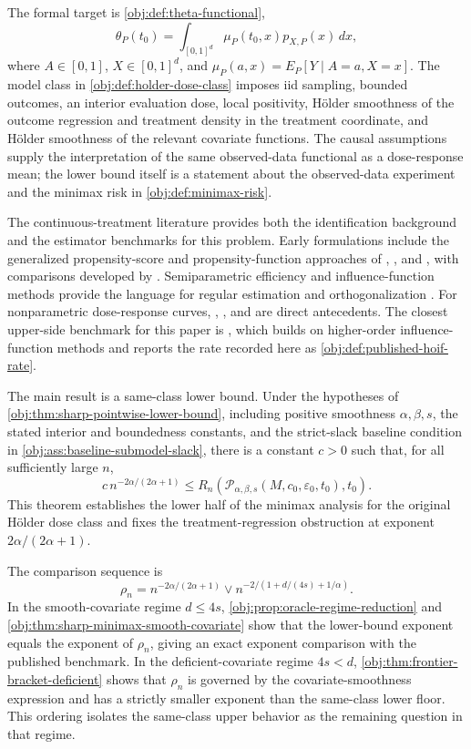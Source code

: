 The formal target is \cref{obj:def:theta-functional},
\[
\theta_P(t_0)=\int_{[0,1]^d}\mu_P(t_0,x)p_{X,P}(x)\,dx,
\]
where \(A\in[0,1]\), \(X\in[0,1]^d\), and \(\mu_P(a,x)=E_P[Y\mid A=a,X=x]\). The model class in \cref{obj:def:holder-dose-class} imposes iid sampling, bounded outcomes, an interior evaluation dose, local positivity, Hölder smoothness of the outcome regression and treatment density in the treatment coordinate, and Hölder smoothness of the relevant covariate functions. The causal assumptions supply the interpretation of the same observed-data functional as a dose-response mean; the lower bound itself is a statement about the observed-data experiment and the minimax risk in \cref{obj:def:minimax-risk}.

The continuous-treatment literature provides both the identification background and the estimator benchmarks for this problem. Early formulations include the generalized propensity-score and propensity-function approaches of \citet{imbens2000}, \citet{hirano2004}, and \citet{imai2004}, with comparisons developed by \citet{zhao2013}. Semiparametric efficiency and influence-function methods provide the language for regular estimation and orthogonalization \citep{bickel1993,vanderVaart1998,vanderLaan2003,chernozhukov2018}. For nonparametric dose-response curves, \citet{kennedy2017}, \citet{lee2018}, and \citet{colangelo2020} are direct antecedents. The closest upper-side benchmark for this paper is \citet{bonvini2022}, which builds on higher-order influence-function methods \citep{robins2008,robins2015} and reports the rate recorded here as \cref{obj:def:published-hoif-rate}.

The main result is a same-class lower bound. Under the hypotheses of \cref{obj:thm:sharp-pointwise-lower-bound}, including positive smoothness \(\alpha,\beta,s\), the stated interior and boundedness constants, and the strict-slack baseline condition in \cref{obj:ass:baseline-submodel-slack}, there is a constant \(c>0\) such that, for all sufficiently large \(n\),
\[
c\,n^{-2\alpha/(2\alpha+1)}
\le
R_n\!\left(
\mathcal P_{\alpha,\beta,s}(M,c_0,\varepsilon_0,t_0),
t_0
\right).
\]
This theorem establishes the lower half of the minimax analysis for the original Hölder dose class and fixes the treatment-regression obstruction at exponent \(2\alpha/(2\alpha+1)\).

The comparison sequence is
\[
\rho_n=
n^{-2\alpha/(2\alpha+1)}
\vee
n^{-2/(1+d/(4s)+1/\alpha)}.
\]
In the smooth-covariate regime \(d\le 4s\), \cref{obj:prop:oracle-regime-reduction} and \cref{obj:thm:sharp-minimax-smooth-covariate} show that the lower-bound exponent equals the exponent of \(\rho_n\), giving an exact exponent comparison with the published benchmark. In the deficient-covariate regime \(4s<d\), \cref{obj:thm:frontier-bracket-deficient} shows that \(\rho_n\) is governed by the covariate-smoothness expression and has a strictly smaller exponent than the same-class lower floor. This ordering isolates the same-class upper behavior as the remaining question in that regime.


